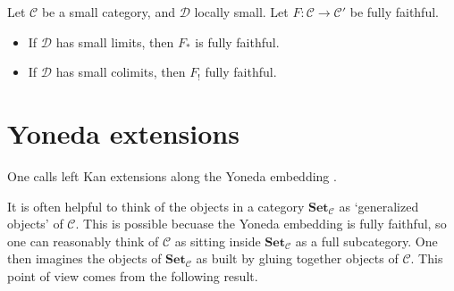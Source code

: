 \documentclass[main.tex]{subfiles}
\begin{document}
\begin{corollary}
  Let $\mathcal{C}$ be a small category, and $\mathcal{D}$ locally small. Let $F\colon \mathcal{C} \to \mathcal{C'}$ be fully faithful.
  \begin{itemize}
    \item If $\mathcal{D}$ has small limits, then $F_{*}$ is fully faithful.

    \item If $\mathcal{D}$ has small colimits, then $F_{!}$ fully faithful.
  \end{itemize}
\end{corollary}


\section{Yoneda extensions}
\label{sec:yoneda_extensions}

\begin{definition}
  \label{def:yoneda_extension}
  One calls left Kan extensions along the Yoneda embedding .
\end{definition}

It is often helpful to think of the objects in a category $\mathbf{Set}_{\mathcal{C}}$ as `generalized objects' of $\mathcal{C}$. This is possible becuase the Yoneda embedding is fully faithful, so one can reasonably think of $\mathcal{C}$ as sitting inside $\mathbf{Set}_{\mathcal{C}}$ as a full subcategory. One then imagines the objects of $\mathbf{Set}_{\mathcal{C}}$ as built by gluing together objects of $\mathcal{C}$. This point of view comes from the following result.
\end{document}
